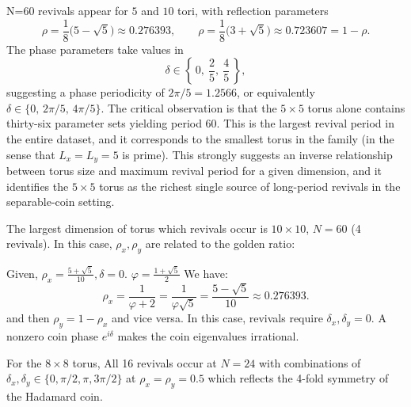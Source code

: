 N=60 revivals appear for $5$ and $10$ tori, with reflection parameters
\begin{equation}
\rho = \frac{1}{8}\bigl(5-\sqrt{5}\bigr) \approx 0.276393, \qquad
\rho = \frac{1}{8}\bigl(3+\sqrt{5}\bigr) \approx 0.723607 = 1-\rho .
\end{equation}
The phase parameters take values in
\begin{equation}
\delta \in \left\{\,0,\ \frac{2}{5},\ \frac{4}{5}\,\right\},
\end{equation}
suggesting a phase periodicity of $2\pi/5=1.2566$, or equivalently
$\delta\in\{0,\,2\pi/5,\,4\pi/5\}$. The critical observation is that the
$5\times5$ torus alone contains thirty-six parameter sets yielding
period 60. This is the largest revival period in the entire dataset,
and it corresponds to the smallest torus in the family (in the sense
that $L_x=L_y=5$ is prime). This strongly suggests an inverse
relationship between torus size and maximum revival period for a given
dimension, and it identifies the $5\times5$ torus as the richest single
source of long-period revivals in the separable-coin setting.

The largest dimension of torus which revivals occur is
$10 \times 10$, $N=60$ (4 revivals). In this case, $\rho_x, \rho_y$ are
related to the golden ratio:

Given, $\rho_x = \frac{5 + \sqrt{5}}{10}, \delta=0$.
$\varphi = \frac{1+\sqrt{5}}{2}$
We have:
\begin{equation}
    \rho_x = \frac{1}{\varphi + 2}
    = \frac{1}{\varphi\sqrt{5}}
    = \frac{5-\sqrt{5}}{10}
    \approx 0.276393.
    \label{eq:rho-golden}
\end{equation}
and then $\rho_y = 1 - \rho_x$ and vice versa. In this case, revivals
require \(\delta_x, \delta_y = 0\). A nonzero coin phase
\(e^{i\delta}\) makes the coin eigenvalues irrational.

For the \textbf{$8 \times 8$} torus, All 16 revivals occur at $N=24$
with combinations of $\delta_x, \delta_y \in \{0, \pi/2, \pi, 3\pi/2\}$
at $\rho_x = \rho_y = 0.5$ which reflects the 4-fold symmetry of the
Hadamard coin.
